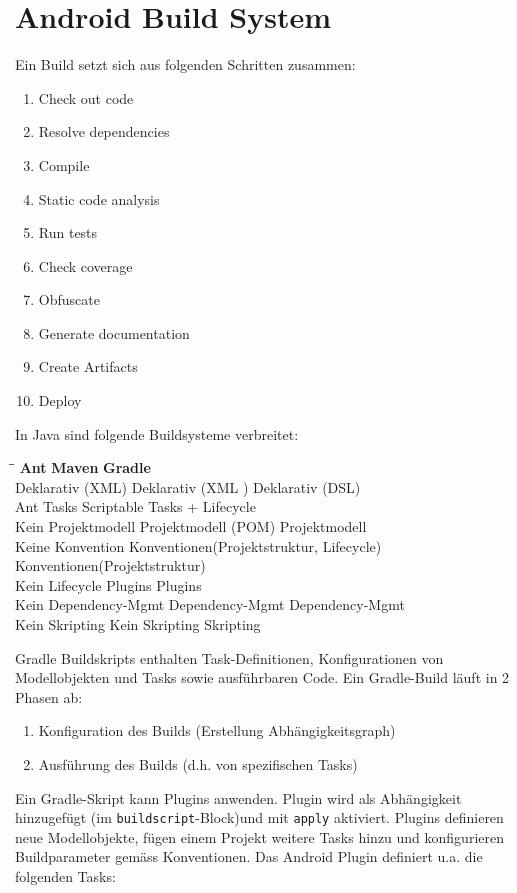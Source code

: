 \chapter{Android Build System}

Ein Build setzt sich aus folgenden Schritten zusammen:
\begin{enumerate}
	\item Check out code
	\item Resolve dependencies
	\item Compile
	\item Static code analysis
	\item Run tests
	\item Check coverage
	\item Obfuscate
	\item Generate documentation
	\item Create Artifacts
	\item Deploy
\end{enumerate}
In Java sind folgende Buildsysteme verbreitet:
\begin{tabbing}
	\hspace{4.2cm}\=\hspace{7cm}\=\kill
	\textbf{Ant} \> \textbf{Maven} \> \textbf{Gradle} \\ 
	Deklarativ (XML) \> Deklarativ (XML ) \> Deklarativ (DSL) \\ 
	Ant Tasks \>  \> Scriptable Tasks + Lifecycle \\ 
	Kein Projektmodell \> Projektmodell (POM) \> Projektmodell \\ 
	Keine Konvention \> Konventionen(Projektstruktur, Lifecycle)  \> Konventionen(Projektstruktur) \\ 
	Kein Lifecycle \> Plugins \> Plugins \\ 
	Kein Dependency-Mgmt \> Dependency-Mgmt \> Dependency-Mgmt \\ 
	Kein Skripting \> Kein Skripting \> Skripting
\end{tabbing}
Gradle Buildskripts enthalten Task-Definitionen, Konfigurationen von Modellobjekten und Tasks sowie ausführbaren Code. Ein Gradle-Build läuft in 2 Phasen ab:
\begin{enumerate}
	\item Konfiguration des Builds (Erstellung Abhängigkeitsgraph)
	\item Ausführung des Builds (d.h. von spezifischen Tasks)
\end{enumerate}
Ein Gradle-Skript kann Plugins anwenden. Plugin wird als Abhängigkeit hinzugefügt (im \texttt{buildscript}-Block)und mit \texttt{apply} aktiviert. Plugins definieren neue Modellobjekte, fügen einem Projekt weitere Tasks hinzu und konfigurieren Buildparameter gemäss Konventionen. Das Android Plugin definiert u.a. die folgenden Tasks:
